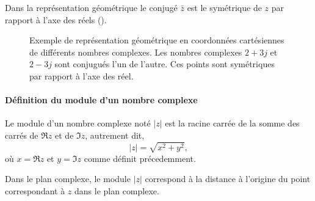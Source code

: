 Dans la représentation géométrique le conjugé $\bar{z}$ est le symétrique 
de $z$ par rapport à l'axe des réels ().
\begin{figure}[!h]
    \centering
    
    \caption{Exemple de représentation géométrique en coordonnées cartésiennes 
             de différents nombres complexes. Les nombres complexes $2+3j$ et 
             $2-3j$ sont conjugués l'un de l'autre. Ces points sont symétriques
             par rapport à l'axe des réel.
             \label{fig-plan_complexe}}
\end{figure}
\paragraph{Définition du module d'un nombre complexe}
Le module d'un nombre complexe noté $|z|$ est la 
racine carrée de la somme des carrés de $\Re{z}$ et de $\Im{z}$, 
autrement dit, 
$$
|z|=\sqrt{x^2+y^2},
$$
où $x=\Re{z}$ et $y=\Im{z}$ comme définit précedemment.

Dans le plan complexe, le module $|z|$ correspond à la distance à l'origine du 
point correspondant à $z$ dans le plan complexe.

